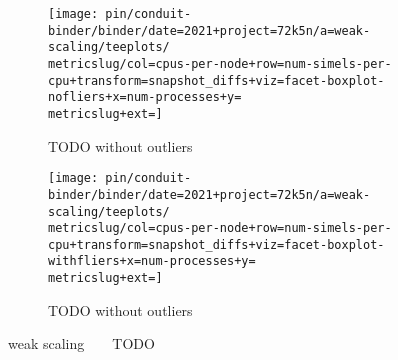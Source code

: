 \begin{figure*}
  \centering
  \begin{subfigure}[b]{0.5\textwidth}
    \centering
    \texttt{[image: pin/conduit-binder/binder/date=2021+project=72k5n/a=weak-scaling/teeplots/\\metricslug/col=cpus-per-node+row=num-simels-per-cpu+transform=snapshot\_diffs+viz=facet-boxplot-nofliers+x=num-processes+y=\\metricslug+ext=]}
    \caption{TODO without outliers}
    \label{fig:weak-scaling-distribution-\metricslug-nofliers}
  \end{subfigure}%
  \begin{subfigure}[b]{0.5\textwidth}
    \centering
    \texttt{[image: pin/conduit-binder/binder/date=2021+project=72k5n/a=weak-scaling/teeplots/\\metricslug/col=cpus-per-node+row=num-simels-per-cpu+transform=snapshot\_diffs+viz=facet-boxplot-withfliers+x=num-processes+y=\\metricslug+ext=]}
    \caption{TODO without outliers}
    \label{fig:weak-scaling-distribution-\metricslug-withfliers}
  \end{subfigure}
  \caption{weak scaling ~ \metric ~ TODO}
  \label{fig:weak-scaling-distribution-\metricslug}
\end{figure*}
